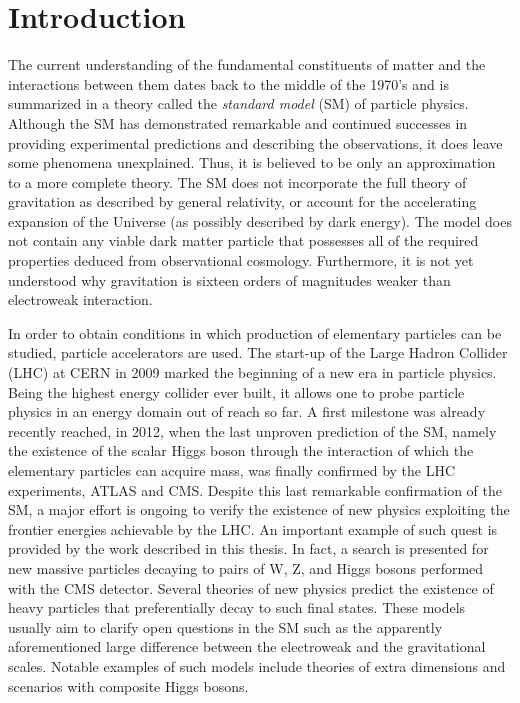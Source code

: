 \chapter{Introduction}
\label{ch:Introduction}

The current understanding of the fundamental constituents of matter and the interactions between them dates back to the middle of the 1970's and is summarized in a theory called the \textit{standard model} (SM) of particle physics. 
Although the SM has demonstrated remarkable and continued successes in providing experimental predictions and describing the observations, 
it does leave some phenomena unexplained. Thus, it is believed to be only an approximation to a more complete theory.
The SM does not incorporate the full theory of gravitation as described by general relativity,
or account for the accelerating expansion of the Universe (as possibly described by dark energy).
The model does not contain any viable dark matter particle that possesses all of the required properties deduced from observational cosmology.
Furthermore, it is not yet understood why gravitation is sixteen orders of magnitudes weaker than electroweak interaction. 

In order to obtain conditions in which production of elementary particles can be studied, particle accelerators are used.
The start-up of the Large Hadron Collider (LHC) at CERN in 2009 marked the beginning of a new era in particle physics.
Being the highest energy collider ever built, it allows one to probe particle physics in an energy domain out of reach so far.
A first milestone was already recently reached, in 2012, when the last unproven prediction of the SM, namely the existence of the scalar Higgs boson through the interaction of which the elementary particles can acquire mass,
was finally confirmed by the LHC experiments, ATLAS and CMS.
Despite this last remarkable confirmation of the SM, a major effort is ongoing to verify the existence of new physics exploiting the frontier energies achievable by the LHC.
An important example of such quest is provided by the work described in this thesis. In fact, a search is presented for new massive particles decaying to pairs of W, Z, and Higgs bosons performed with the CMS detector.
Several theories of new physics predict the existence of heavy particles that preferentially decay to such final states.
These models usually aim to clarify open questions in the SM such as the apparently aforementioned large difference between the electroweak and the gravitational scales.
Notable examples of such models include theories of extra dimensions and scenarios with composite Higgs bosons.

